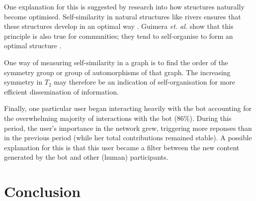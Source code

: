 \documentclass{sig-alternate}
\begin{document}
One explanation for this is suggested by research into how structures naturally become optimised. Self-similarity in natural structures like rivers ensures that these structures develop in an optimal way \cite{murray:min}. Guimera \emph{et. al.} show that this principle is also true for communities; they tend to self-organise to form an optimal structure \cite{guimera:comm}.

One way of measuring self-similarity in a graph is to find the order of the symmetry group or group of automorphisms of that graph. The increasing symmetry in $T_2$ may therefore be an indication of self-organisation for more efficient dissemination of information.

Finally, one particular user began interacting heavily with the bot accounting for the overwhelming majority of interactions with the bot (86\%). During this period, the user's importance in the network grew, triggering more reponses than in the previous period (while her total contributions remained stable). A possible explanation for this is that this user became a filter between the new content generated by the bot and other (human) participants.

\section{Conclusion}


\end{document}
